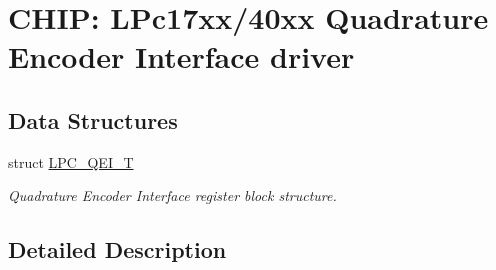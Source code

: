 \hypertarget{group__QEI__17XX__40XX}{\section{C\-H\-I\-P\-: L\-Pc17xx/40xx Quadrature Encoder Interface driver}
\label{group__QEI__17XX__40XX}
}
\subsection*{Data Structures}
\begin{DoxyCompactItemize}
\item 
struct \hyperlink{structLPC__QEI__T}{L\-P\-C\-\_\-\-Q\-E\-I\-\_\-\-T}
\begin{DoxyCompactList}\small\item\em Quadrature Encoder Interface register block structure. \end{DoxyCompactList}\end{DoxyCompactItemize}


\subsection{Detailed Description}
